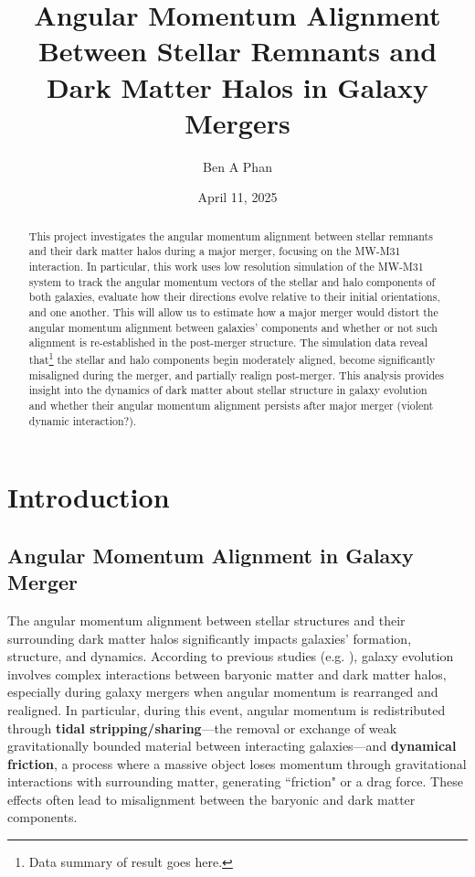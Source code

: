 \documentclass[twocolumn]{aastex631}
\begin{document}
\title{Angular Momentum Alignment Between Stellar Remnants and Dark Matter Halos in Galaxy Mergers}
\author{Ben A Phan}
\date{April 11, 2025}

\begin{abstract}
    This project investigates the angular momentum alignment between stellar remnants and their dark matter halos during a major merger, focusing on the MW-M31 interaction. In particular, this work uses low resolution simulation of the MW-M31 system to track the angular momentum vectors of the stellar and halo components of both galaxies, evaluate how their directions evolve relative to their initial orientations, and one another. This will allow us to estimate how a major merger would distort the angular momentum alignment between galaxies' components and whether or not such alignment is re-established in the post-merger structure. The simulation data reveal that\footnote{Data summary of result goes here.} the stellar and halo components begin moderately aligned, become significantly misaligned during the merger, and partially realign post-merger. This analysis provides insight into the dynamics of dark matter about stellar structure in galaxy evolution and whether their angular momentum alignment persists after major merger (violent dynamic interaction?).
\end{abstract}



\section{Introduction}


\subsection{Angular Momentum Alignment in Galaxy Merger}
The angular momentum alignment between stellar structures and their surrounding dark matter halos significantly impacts galaxies' formation, structure, and dynamics. According to previous studies (e.g. \cite{Somerville2008, Chua2019, Baptista2023}), galaxy evolution involves complex interactions between baryonic matter and dark matter halos, especially during galaxy mergers when angular momentum is rearranged and realigned. In particular, during this event, angular momentum is redistributed through \textbf{tidal stripping/sharing}—the removal or exchange of weak gravitationally bounded material between interacting galaxies—and \textbf{dynamical friction}, a process where a massive object loses momentum through gravitational interactions with surrounding matter, generating ``friction" or a drag force. These effects often lead to misalignment between the baryonic and dark matter components. 
\end{document}
